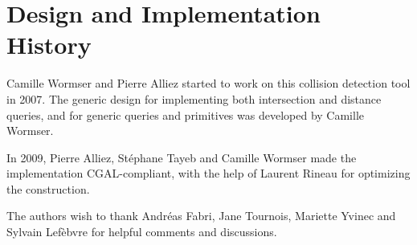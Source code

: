 \section{Design and Implementation History}
\label{AABB_tree_section_history}

Camille Wormser and Pierre Alliez started to work on this collision detection tool in 2007. The generic design for implementing both intersection and distance queries, and for generic queries and primitives was developed by Camille Wormser.

In 2009, Pierre Alliez, St\'ephane Tayeb and Camille Wormser made the implementation CGAL-compliant, with the help of Laurent Rineau for optimizing the construction.

The authors wish to thank Andr\'eas Fabri, Jane Tournois, Mariette Yvinec and Sylvain Lef\`ebvre for helpful comments and discussions.
